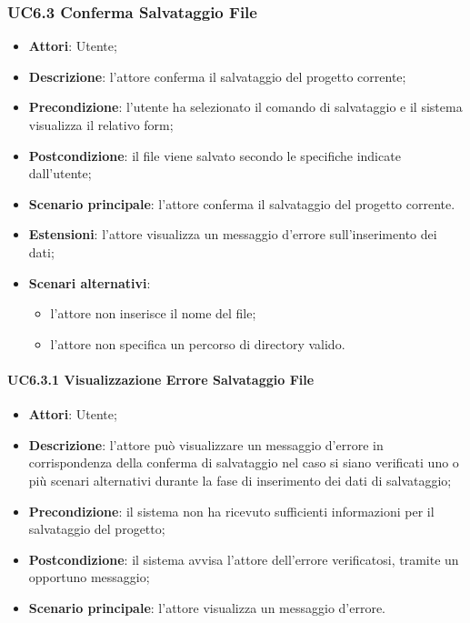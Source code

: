 \begin{itemize}
\begin{itemize}
\begin{itemize}
\begin{itemize}
\subsubsection{UC6.3 Conferma Salvataggio File}
\label{UC6.3}
\begin{itemize}
	\item \textbf{Attori}: Utente;
	\item \textbf{Descrizione}: l'attore conferma il salvataggio del progetto corrente;
	\item \textbf{Precondizione}: l'utente ha selezionato il comando di salvataggio e il sistema visualizza il relativo form;
	\item \textbf{Postcondizione}: il file viene salvato secondo le specifiche indicate dall'utente;
	\item \textbf{Scenario principale}: l'attore conferma il salvataggio del progetto corrente.
	\item \textbf{Estensioni}: l'attore visualizza un messaggio d'errore sull'inserimento dei dati;
	\item \textbf{Scenari alternativi}:
		\begin{itemize}
		\item l'attore non inserisce il nome del file;
		\item l'attore non specifica un percorso di directory valido.
	\end{itemize}
\end{itemize}

\paragraph{UC6.3.1 Visualizzazione Errore Salvataggio File}
\begin{itemize}
	\item \textbf{Attori}: Utente;
	\item \textbf{Descrizione}: l'attore può visualizzare un messaggio d'errore in corrispondenza della conferma di salvataggio nel caso si siano verificati uno o più scenari alternativi durante la fase di inserimento dei dati di salvataggio;
	\item \textbf{Precondizione}: il sistema non ha ricevuto sufficienti informazioni per il salvataggio del progetto;
	\item \textbf{Postcondizione}: il sistema avvisa l'attore dell'errore verificatosi, tramite un opportuno messaggio;
	\item \textbf{Scenario principale}: l'attore visualizza un messaggio d'errore.
\end{itemize}


\end{itemize}
\end{itemize}
\end{itemize}
\end{itemize}
